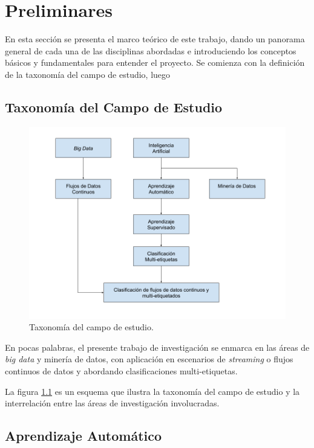 \chapter{Preliminares}


En esta sección se presenta el marco teórico de este trabajo, dando un panorama
general de cada una de las disciplinas abordadas e introduciendo los conceptos
básicos y fundamentales para entender el proyecto. Se comienza con la definición
de la taxonomía del campo de estudio, luego 

\section{Taxonomía del Campo de Estudio}

\begin{figure}
   \includegraphics[width=.9\linewidth]{figures/study_field_taxonomy_v2.png}
   \centering
   \caption{Taxonomía del campo de estudio.}
   \label{fig:campo_estudio}
\end{figure}

En pocas palabras, el presente trabajo de investigación se enmarca en las áreas
de \textit{big data} y minería de datos, con aplicación en escenarios de
\textit{streaming} o flujos continuos de datos y abordando clasificaciones
multi-etiquetas. 

La figura \ref{fig:campo_estudio} es un esquema que ilustra la taxonomía del
campo de estudio y la interrelación entre las áreas de investigación
involucradas.

\section{Aprendizaje Automático}


